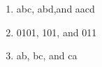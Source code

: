 \begin{enumerate}
\begin{enumerate}
			\begin{enumerate}
		\item abc, abd,and aacd 
		\item 0101, 101, and 011
		\item ab, bc, and ca 
	\end{enumerate}
\end{enumerate}

\end{enumerate}


